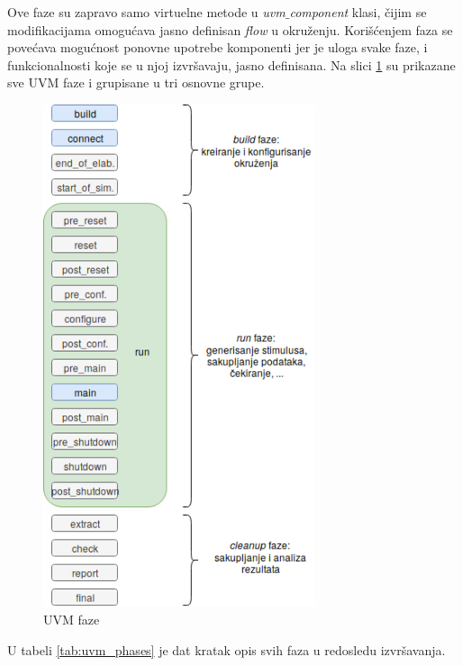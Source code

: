 Ove faze su zapravo samo virtuelne metode u \emph{uvm\(\_\)component} klasi,
čijim se modifikacijama omogućava jasno definisan \emph{flow} u okruženju.
Korišćenjem faza se povećava mogućnost ponovne upotrebe komponenti jer je uloga
svake faze, i funkcionalnosti koje se u njoj izvršavaju, jasno definisana. Na
slici \ref{fig:uvm_phases} su prikazane sve UVM faze i grupisane u tri osnovne
grupe.\\

\begin{figure}
  \centering
  \includegraphics[width=80mm, scale=0.5]{img/v5_uvm_phases.png}
  \caption{UVM faze}
  \label{fig:uvm_phases}
\end{figure}

U tabeli \ref{tab:uvm_phases} je dat kratak opis svih faza u redosledu izvršavanja.\\

